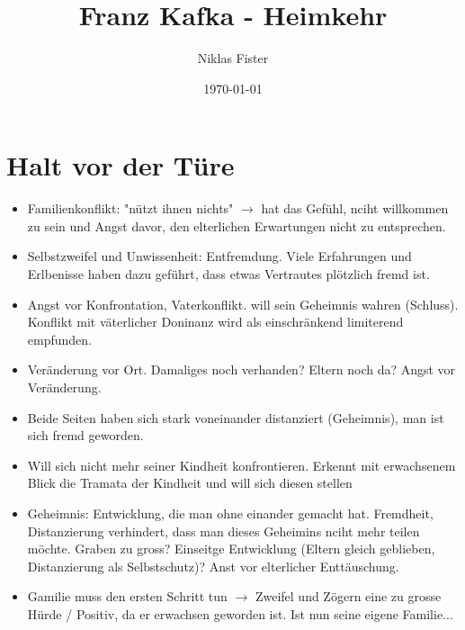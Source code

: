 \documentclass{article}
\title{\huge\textbf{Franz Kafka - Heimkehr}}
\author{Niklas Fister}
\date{\today}
\begin{document}
\maketitle
\newpage

\section{Halt vor der Türe}
\begin{itemize}[parsep=0pt]
    \item Familienkonflikt: "nützt ihnen nichts" $\rightarrow$ hat das Gefühl, nciht willkommen zu sein und Angst davor, den elterlichen Erwartungen nicht zu entsprechen.
    \item Selbstzweifel und Unwissenheit: Entfremdung. Viele Erfahrungen und Erlbenisse haben dazu geführt, dass etwas Vertrautes plötzlich fremd ist.
    \item Angst vor Konfrontation, Vaterkonflikt. will sein Geheimnis wahren (Schluss). Konflikt mit väterlicher Doninanz wird als einschränkend limiterend empfunden.
    \item Veränderung vor Ort. Damaliges noch verhanden? Eltern noch da? Angst vor Veränderung.
    \item Beide Seiten haben sich stark voneinander distanziert (Geheimnis), man ist sich fremd geworden.
    \item Will sich nicht mehr seiner Kindheit konfrontieren. Erkennt mit erwachsenem Blick die Tramata der Kindheit und will sich diesen stellen
    \item Geheimnis: Entwicklung, die man ohne einander gemacht hat. Fremdheit, Distanzierung verhindert, dass man dieses Geheimins nciht mehr teilen möchte. Graben zu gross? Einseitge Entwicklung (Eltern gleich geblieben, Distanzierung als Selbstschutz)? Anst vor elterlicher Enttäuschung.
    \item Gamilie muss den ersten Schritt tun $\rightarrow$ Zweifel und Zögern eine zu grosse Hürde / Positiv, da er erwachsen geworden ist. Ist nun seine eigene Familie...
\end{itemize}
\end{document}
